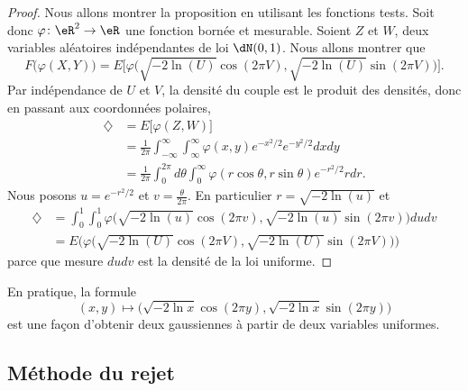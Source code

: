 \begin{proof}
	Nous allons montrer la proposition en utilisant les fonctions tests. Soit donc \( \varphi\colon \eR^2\to \eR\) une fonction bornée et mesurable. Soient \( Z\) et \( W\), deux variables aléatoires indépendantes de loi \( \dN(0,1)\). Nous allons montrer que
	\begin{equation}
		F\big( \varphi(X,Y) \big)=E\Big[ \varphi\big( \sqrt{-2\ln(U)}\cos(2\pi V),\sqrt{-2\ln(U)}\sin(2\pi V) \big) \Big].
	\end{equation}
	Par indépendance de \( U\) et \( V\), la densité du couple est le produit des densités, donc en passant aux coordonnées polaires,
	\begin{subequations}
		\begin{align}
			\diamondsuit & =E\big[ \varphi(Z,W) \big]                                                                           \\
			             & =\frac{1}{ 2\pi }\int_{-\infty}^{\infty}\int_{\infty}^{\infty}\varphi(x,y) e^{-x^2/2} e^{-y^2/2}dxdy \\
			             & =\frac{1}{ 2\pi }\int_0^{2\pi}d\theta\int_0^{\infty}\varphi(r\cos\theta,r\sin\theta) e^{-r^2/2}rdr.
		\end{align}
	\end{subequations}
	Nous posons \( u= e^{-r^2/2}\) et \( v=\frac{ \theta }{ 2\pi }\). En particulier \( r=\sqrt{-2\ln(u)}\) et
	\begin{subequations}
		\begin{align}
			\diamondsuit & =\int_0^1\int_0^1\varphi\big( \sqrt{-2\ln(u)}\cos(2\pi v),\sqrt{-2\ln(u)}\sin(2\pi v) \big)dudv \\
			             & =E\Big( \varphi\big( \sqrt{-2\ln(U)}\cos(2\pi V),\sqrt{-2\ln(U)}\sin(2\pi V) \big) \Big)
		\end{align}
	\end{subequations}
	parce que mesure \( dudv\) est la densité de la loi uniforme.
\end{proof}

En pratique, la formule
\begin{equation}
	(x,y)\mapsto\big( \sqrt{-2\ln x}\cos(2\pi y),\sqrt{-2\ln x}\sin(2\pi y) \big)
\end{equation}
est une façon d'obtenir deux gaussiennes à partir de deux variables uniformes.

\subsection{Méthode du rejet}

